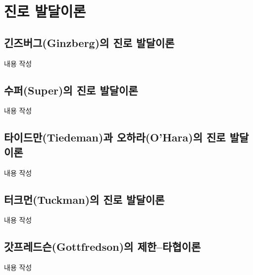 \section{진로 발달이론}

\subsection{긴즈버그(Ginzberg)의 진로 발달이론}
내용 작성

\subsection{수퍼(Super)의 진로 발달이론}
내용 작성

\subsection{타이드만(Tiedeman)과 오하라(O'Hara)의 진로 발달이론}
내용 작성

\subsection{터크먼(Tuckman)의 진로 발달이론}
내용 작성

\subsection{갓프레드슨(Gottfredson)의 제한–타협이론}
내용 작성

